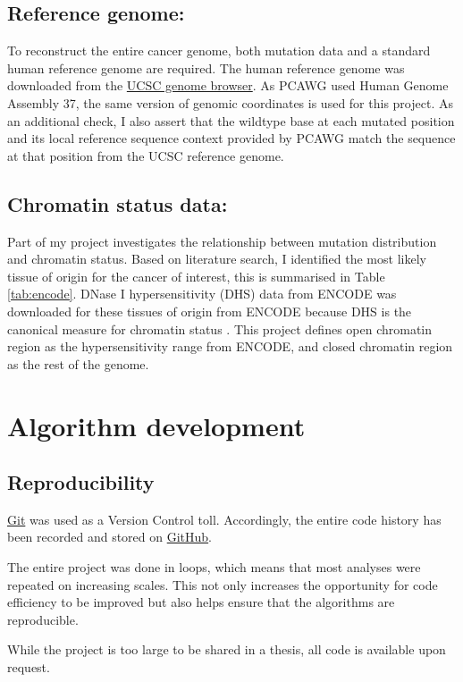 \subsection{Reference genome:} 
To reconstruct the entire cancer genome, both mutation data and a standard human reference genome are required. The human reference genome was downloaded from the \href{http://hgdownload.soe.ucsc.edu/goldenPath/hg19/chromosomes}{UCSC genome browser}. As PCAWG used Human Genome Assembly 37, the same version of genomic coordinates is used for this project. As an additional check, I also assert that the wildtype base at each mutated position and its local reference sequence context provided by PCAWG match the sequence at that position from the UCSC reference genome. 

\subsection{Chromatin status data:} 
Part of my project investigates the relationship between mutation distribution and chromatin status. Based on literature search, I identified the most likely tissue of origin for the cancer of interest, this is summarised in Table \ref{tab:encode}. DNase I hypersensitivity (DHS) data from ENCODE was downloaded for these tissues of origin from ENCODE because DHS is the canonical measure for chromatin status \citep{Thurman2012TheGenome,Klemm2019ChromatinEpigenome}. This project defines open chromatin region as the hypersensitivity range from ENCODE, and closed chromatin region as the rest of the genome.

\section{Algorithm development}
\subsection{Reproducibility} 
\href{http://git-scm.com}{Git} was used as a Version Control toll. Accordingly, the entire code history has been recorded and stored on \href{https://github.com}{GitHub}.

The entire project was done in loops, which means that most analyses were repeated on increasing scales. This not only increases the opportunity for code efficiency to be improved but also helps ensure that the algorithms are reproducible. 

While the project is too large to be shared in a thesis, all code is available upon request. 

